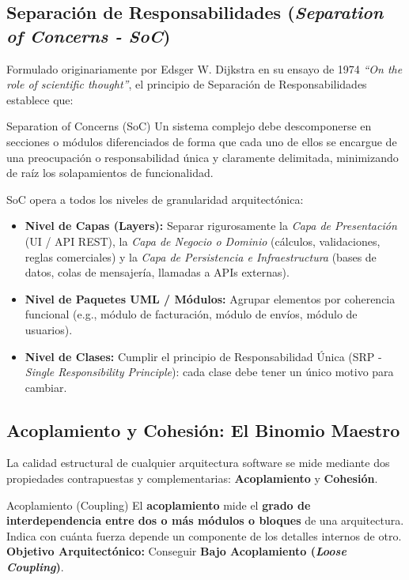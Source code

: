 \subsection{Separación de Responsabilidades (\emph{Separation of Concerns - SoC})}

Formulado originariamente por Edsger W. Dijkstra en su ensayo de 1974 \emph{``On the role of scientific thought''}, el principio de Separación de Responsabilidades establece que:

\begin{definicion}{Separation of Concerns (SoC)}
Un sistema complejo debe descomponerse en secciones o módulos diferenciados de forma que cada uno de ellos se encargue de una preocupación o responsabilidad única y claramente delimitada, minimizando de raíz los solapamientos de funcionalidad.
\end{definicion}

SoC opera a todos los niveles de granularidad arquitectónica:
\begin{itemize}[leftmargin=1.5em]
  \item \textbf{Nivel de Capas (Layers):} Separar rigurosamente la \emph{Capa de Presentación} (UI / API REST), la \emph{Capa de Negocio o Dominio} (cálculos, validaciones, reglas comerciales) y la \emph{Capa de Persistencia e Infraestructura} (bases de datos, colas de mensajería, llamadas a APIs externas).
  \item \textbf{Nivel de Paquetes UML / Módulos:} Agrupar elementos por coherencia funcional (e.g., módulo de facturación, módulo de envíos, módulo de usuarios).
  \item \textbf{Nivel de Clases:} Cumplir el principio de Responsabilidad Única (SRP - \emph{Single Responsibility Principle}): cada clase debe tener un único motivo para cambiar.
\end{itemize}

\subsection{Acoplamiento y Cohesión: El Binomio Maestro}

La calidad estructural de cualquier arquitectura software se mide mediante dos propiedades contrapuestas y complementarias: \textbf{Acoplamiento} y \textbf{Cohesión}.

\begin{definicion}{Acoplamiento (Coupling)}
El \textbf{acoplamiento} mide el \textbf{grado de interdependencia entre dos o más módulos o bloques} de una arquitectura. Indica con cuánta fuerza depende un componente de los detalles internos de otro. \\
\textbf{Objetivo Arquitectónico:} Conseguir \textbf{Bajo Acoplamiento (\emph{Loose Coupling})}.
\end{definicion}

